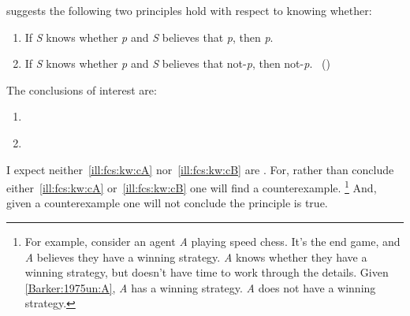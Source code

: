\begin{note}
  \begin{scenario}%
    \label{ill:fcs:kw}%
    \citeauthor{Barker:1975un} suggests the following two principles hold with respect to knowing whether:

    \begin{enumerate}[label=(\Alph*), ref=(\Alph*)]
    \item
      \label{Barker:1975un:A}
      If \emph{S} knows whether \emph{p} and \emph{S} believes that \emph{p}, then \emph{p}.
    \item
      \label{Barker:1975un:B}
      If \emph{S} knows whether \emph{p} and \emph{S} believes that not-\emph{p}, then not-\emph{p}.%
      \mbox{ }\hfill\mbox{(\citeyear[281]{Barker:1975un})}
    \end{enumerate}
  \end{scenario}

  \noindent The conclusions of interest are:

  \begin{enumerate}[label=C\Alph*., ref=(C\Alph*)]
  \item
    \label{ill:fcs:kw:cA}
  \item
    \label{ill:fcs:kw:cB}
  \end{enumerate}

  \noindent I expect neither~\ref{ill:fcs:kw:cA} nor~\ref{ill:fcs:kw:cB} are .
  For, rather than conclude either~\ref{ill:fcs:kw:cA} or~\ref{ill:fcs:kw:cB} one will find a counterexample.%
  \footnote{
    For example, consider an agent \emph{A} playing speed chess.
    It's the end game, and \emph{A} believes they have a winning strategy.
    \emph{A} knows whether they have a winning strategy, but doesn't have time to work through the details.
    Given \ref{Barker:1975un:A}, \emph{A} has a winning strategy.
    \emph{A} does not have a winning strategy.
  }
  And, given a counterexample one will not conclude the principle is true.
\end{note}

